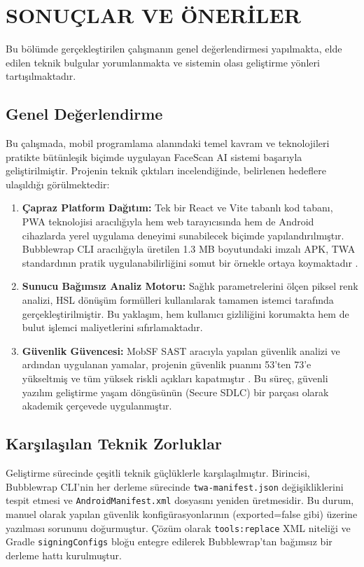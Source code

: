\section{SONUÇLAR VE ÖNERİLER}

Bu bölümde gerçekleştirilen çalışmanın genel değerlendirmesi yapılmakta, elde edilen teknik bulgular yorumlanmakta ve sistemin olası geliştirme yönleri tartışılmaktadır.

\subsection{Genel Değerlendirme}

Bu çalışmada, mobil programlama alanındaki temel kavram ve teknolojileri pratikte bütünleşik biçimde uygulayan FaceScan AI sistemi başarıyla geliştirilmiştir. Projenin teknik çıktıları incelendiğinde, belirlenen hedeflere ulaşıldığı görülmektedir:

\begin{enumerate}
  \item \textbf{Çapraz Platform Dağıtım:} Tek bir React ve Vite tabanlı kod tabanı, PWA teknolojisi aracılığıyla hem web tarayıcısında hem de Android cihazlarda yerel uygulama deneyimi sunabilecek biçimde yapılandırılmıştır. Bubblewrap CLI aracılığıyla üretilen 1.3 MB boyutundaki imzalı APK, TWA standardının pratik uygulanabilirliğini somut bir örnekle ortaya koymaktadır \cite{google2023twa}.

  \item \textbf{Sunucu Bağımsız Analiz Motoru:} Sağlık parametrelerini ölçen piksel renk analizi, HSL dönüşüm formülleri kullanılarak tamamen istemci tarafında gerçekleştirilmiştir. Bu yaklaşım, hem kullanıcı gizliliğini korumakta hem de bulut işlemci maliyetlerini sıfırlamaktadır.

  \item \textbf{Güvenlik Güvencesi:} MobSF SAST aracıyla yapılan güvenlik analizi ve ardından uygulanan yamalar, projenin güvenlik puanını 53'ten 73'e yükseltmiş ve tüm yüksek riskli açıkları kapatmıştır \cite{mobsf2023docs}. Bu süreç, güvenli yazılım geliştirme yaşam döngüsünün (Secure SDLC) bir parçası olarak akademik çerçevede uygulanmıştır.
\end{enumerate}

\subsection{Karşılaşılan Teknik Zorluklar}

Geliştirme sürecinde çeşitli teknik güçlüklerle karşılaşılmıştır. Birincisi, Bubblewrap CLI'nin her derleme sürecinde \texttt{twa-manifest.json} değişikliklerini tespit etmesi ve \texttt{AndroidManifest.xml} dosyasını yeniden üretmesidir. Bu durum, manuel olarak yapılan güvenlik konfigürasyonlarının (exported=false gibi) üzerine yazılması sorununu doğurmuştur. Çözüm olarak \texttt{tools:replace} XML niteliği ve Gradle \texttt{signingConfigs} bloğu entegre edilerek Bubblewrap'tan bağımsız bir derleme hattı kurulmuştur.

